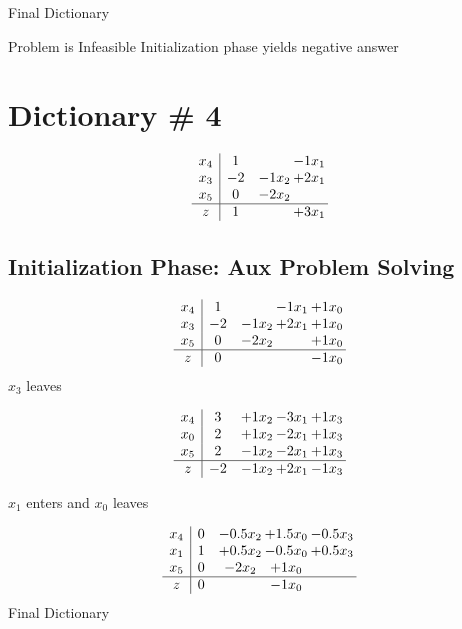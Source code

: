 \documentclass[12pt]{article}
\begin{document}
Final Dictionary


Problem is Infeasible Initialization phase yields negative answer 


\section{Dictionary \# 4}
\[\begin{array}{c| c c@{\hskip 2pt} c@{\hskip 2pt} }
 x_{4}   &  1  &   & -1 x_{1}\\
 x_{3}   &  -2 & -1 x_{2} & + 2 x_{1}\\
 x_{5}   &  0 & -2 x_{2} &   \\
\hline
z    &  1  &   & + 3 x_{1}\\
\end{array}\]
\subsection{Initialization Phase: Aux Problem Solving}
\[\begin{array}{c| c c@{\hskip 2pt} c@{\hskip 2pt} c@{\hskip 2pt} }
 x_{4}   &  1  &   & -1 x_{1} & + 1 x_{0}\\
 x_{3}   &  -2 & -1 x_{2} & + 2 x_{1} & + 1 x_{0}\\
 x_{5}   &  0 & -2 x_{2} &   & + 1 x_{0}\\
\hline
z    &  0  &    &   & -1 x_{0}\\
\end{array}\]
$ x_{3} $ leaves 

 \[\begin{array}{c| c c@{\hskip 2pt} c@{\hskip 2pt} c@{\hskip 2pt} }
 x_{4}   &  3 & + 1 x_{2} & -3 x_{1} & + 1 x_{3}\\
 x_{0}   &  2 & + 1 x_{2} & -2 x_{1} & + 1 x_{3}\\
 x_{5}   &  2 & -1 x_{2} & -2 x_{1} & + 1 x_{3}\\
\hline
z    &  -2 & -1 x_{2} & + 2 x_{1} & -1 x_{3}\\
\end{array}\]


 $ x_{1} $ enters and $ x_{0} $ leaves 

 \[\begin{array}{c| c c@{\hskip 2pt} c@{\hskip 2pt} c@{\hskip 2pt} }
 x_{4}   &  0 & -0.5 x_{2} & + 1.5 x_{0} & -0.5 x_{3}\\
 x_{1}   &  1 & + 0.5 x_{2} & -0.5 x_{0} & + 0.5 x_{3}\\
 x_{5}   &  0 & -2 x_{2} & + 1 x_{0} &   \\
\hline
z    &  0  &   & -1 x_{0} &   \\
\end{array}\]
Final Dictionary
\end{document}
